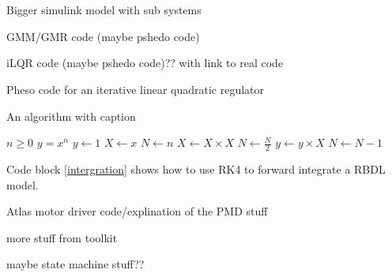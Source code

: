 \chapter{}



Bigger simulink model with sub systems

GMM/GMR code (maybe pshedo code)

iLQR code (maybe pshedo code)?? with link to real code

Pheso code for an iterative linear quadratic regulator

\begin{algorithm}
\caption{An algorithm with caption}\label{alg:cap}
\begin{algorithmic}
\Require $n \geq 0$
\Ensure $y = x^n$
\State $y \gets 1$
\State $X \gets x$
\State $N \gets n$
    \State $X \gets X \times X$
    \State $N \gets \frac{N}{2}$  
    \State $y \gets y \times X$
    \State $N \gets N - 1$
\EndIf
\EndWhile
\end{algorithmic}
\end{algorithm}



Code block  \autoref{intergration}  shows how to use RK4 to forward integrate a RBDL model. 



Atlas motor driver code/explination of the PMD stuff

more stuff from toolkit

maybe state machine stuff?? 